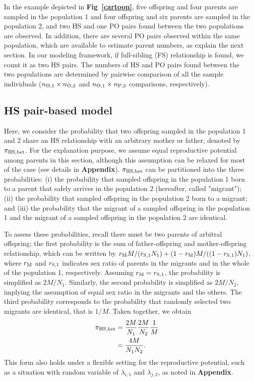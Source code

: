 \documentclass[12pt, English]{article}
\begin{document}
\begin{spacing}{1.9}
In the example depicted in {\bf Fig~\ref{cartoon}}, five offspring and four parents are sampled in the population 1 and four offspring and six parents are sampled in the population 2, and two HS and one PO pairs found between the two populations are observed. In addition, there are several PO pairs observed within the same population, which are available to estimate parent numbers, as explain the next section. In our modeling framework, if full-sibling (FS) relationship is found, we count it as two HS pairs. The numbers of HS and PO pairs found between the two populations are determined by pairwise comparison of all the sample individuals ($n_{\rm O,1}\times n_{\rm O,2}$ and $n_{\rm O,1}\times n_{\rm P,2}$ comparisons, respectively). 

\subsection{HS pair-based model}

Here, we consider the probability that two offspring sampled in the population 1 and 2 share an HS relationship with an arbitrary mother or father, denoted by $\pi_{\rm HS, bet}$. For the explanation purpose, we assume equal reproductive potential among parents in this section, although this assumption can be relaxed for most of the case (see details in {\bf Appendix}). $\pi_{\rm HS, bet}$ can be partitioned into the three probabilities: (i) the probability that sampled offspring in the population 1 born to a parent that safely arrives in the population 2 (hereafter, called "migrant"); (ii) the probability that sampled offspring in the population 2 born to a migrant; and (iii) the probability that the migrant of a sampled offspring in the population 1 and the migrant of a sampled offspring in the population 2 are identical. 

To assess these probabilities, recall there must be two parents of arbitral offspring; the first probability is the sum of father-offspring and mother-offspring relationship, which can be written by $r_{\rm M}M/(r_{\rm S,1}N_{1}) + (1 - r_{\rm M})M/((1-r_{\rm S,1})N_{1})$, where $r_{\rm M}$ and $r_{\rm S,1}$ indicates sex ratio of parents in the migrants and in the whole of the population 1, respectively. Assuming $r_{\rm M} = r_{\rm S,1}$, the probability is simplified as $2M/N_{1}$. Similarly, the second probability is simplified as $2M/N_{2}$, implying the assumption of equal sex ratio in the migrants and the others. The third probability corresponds to the probability that randomly selected two migrants are identical, that is $1/M$. Taken together, we obtain
\begin{align}
\pi_{\rm HS,bet} &= \frac{2M}{N_{1}} \frac{2M}{N_{2}} \frac{1}{M} \nonumber\\
&= \frac{4M}{N_{1}N_{2}}.
\label{HS-1}
\end{align}
This form also holds under a flexible setting for the reproductive potential, such as a situation with random variable of $\lambda_{i,1}$ and $\lambda_{j,2}$, as noted in {\bf Appendix}. 


\end{spacing}
\end{document}

